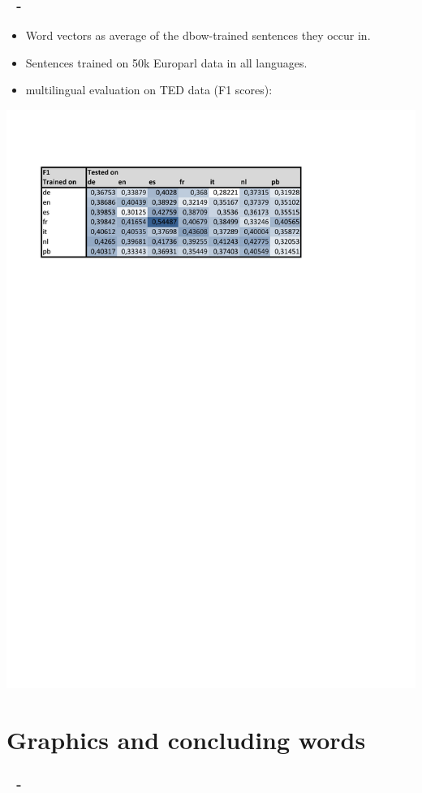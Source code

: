 \documentclass{beamer}
\newenvironment{dia}
{
\begin{frame}[fragile, environment=dia]
\frametitle{\insertsection
\ifx\insertsubsection\empty\else
      \,~-~\insertsubsection             %
   \fi}
}
{
\end{frame}
}
\begin{document}
\begin{dia}
\begin{itemize}
\item Word vectors as average of the dbow-trained sentences they occur in.
\item Sentences trained on 50k Europarl data in all languages.
\item multilingual evaluation on TED data (F1 scores):
\end{itemize}
\includegraphics[width=\textwidth]{figures/multilingdbow}
\end{dia}

\section{Graphics and concluding words}

\begin{dia}

\end{dia}
\end{document}
